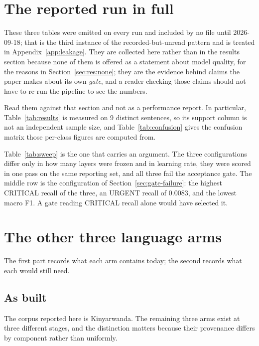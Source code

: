 \section{The reported run in full}
\label{app:run}

These three tables were emitted on every run and included by no file until
2026-09-18; that is the third instance of the recorded-but-unread pattern and is
treated in Appendix~\ref{app:leakage}. They are collected here rather than in
the results section because none of them is offered as a statement about model
quality, for the reasons in Section~\ref{sec:res:none}; they are the evidence
behind claims the paper makes about its own \emph{gate}, and a reader checking
those claims should not have to re-run the pipeline to see the numbers.

Read them against that section and not as a performance report. In particular,
Table~\ref{tab:results} is measured on 9 distinct sentences, so its support
column is not an independent sample size, and Table~\ref{tab:confusion} gives
the confusion matrix those per-class figures are computed from.





Table~\ref{tab:sweep} is the one that carries an argument. The three
configurations differ only in how many layers were frozen and in learning rate,
they were scored in one pass on the same reporting set, and all three fail the
acceptance gate. The middle row is the configuration of
Section~\ref{sec:gate-failure}: the highest CRITICAL recall of the three, an
URGENT recall of 0.0083, and the lowest macro F1. A gate reading CRITICAL
recall alone would have selected it.

\section{The other three language arms}
\label{app:arms}

The first part records what each arm contains today; the second records what
each would still need.

\subsection{As built}

The corpus reported here is Kinyarwanda. The remaining three arms exist at
three different stages, and the distinction matters because their provenance
differs by component rather than uniformly.

